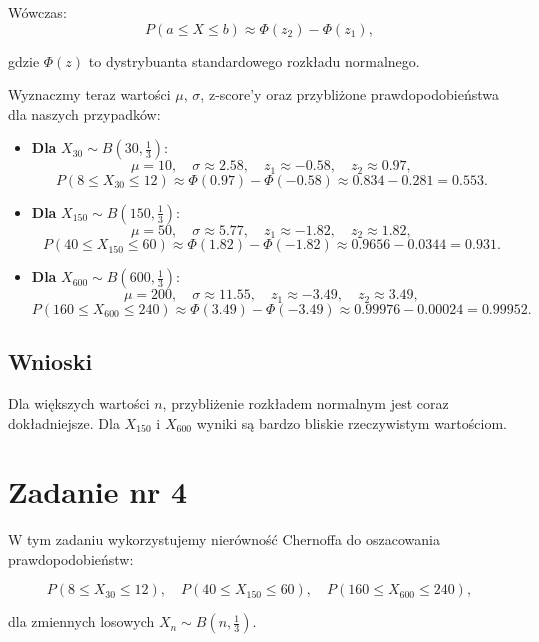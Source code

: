 \documentclass{article}
\begin{document}
Wówczas:
\[
P(a \leq X \leq b) \approx \Phi(z_2) - \Phi(z_1),
\]

gdzie \( \Phi(z) \) to dystrybuanta standardowego rozkładu normalnego.

\vspace{1em}
Wyznaczmy teraz wartości \( \mu \), \( \sigma \), z-score'y oraz przybliżone prawdopodobieństwa dla naszych przypadków:

\begin{itemize}
    \item \textbf{Dla} \( X_{30} \sim B(30, \frac{1}{3}) \):
    \[
    \mu = 10, \quad \sigma \approx 2.58, \quad
    z_1 \approx -0.58, \quad z_2 \approx 0.97,
    \]
    \[
    P(8 \leq X_{30} \leq 12) \approx \Phi(0.97) - \Phi(-0.58) \approx 0.834 - 0.281 = 0.553.
    \]

    \item \textbf{Dla} \( X_{150} \sim B(150, \frac{1}{3}) \):
    \[
    \mu = 50, \quad \sigma \approx 5.77, \quad
    z_1 \approx -1.82, \quad z_2 \approx 1.82,
    \]
    \[
    P(40 \leq X_{150} \leq 60) \approx \Phi(1.82) - \Phi(-1.82) \approx 0.9656 - 0.0344 = 0.931.
    \]

    \item \textbf{Dla} \( X_{600} \sim B(600, \frac{1}{3}) \):
    \[
    \mu = 200, \quad \sigma \approx 11.55, \quad
    z_1 \approx -3.49, \quad z_2 \approx 3.49,
    \]
    \[
    P(160 \leq X_{600} \leq 240) \approx \Phi(3.49) - \Phi(-3.49) \approx 0.99976 - 0.00024 = 0.99952.
    \]
\end{itemize}

\subsection*{Wnioski}

Dla większych wartości \( n \), przybliżenie rozkładem normalnym jest coraz dokładniejsze. Dla \( X_{150} \) i \( X_{600} \) wyniki są bardzo bliskie rzeczywistym wartościom.

\section{Zadanie nr 4}

W tym zadaniu wykorzystujemy nierówność Chernoffa do oszacowania prawdopodobieństw:

\[
P(8 \leq X_{30} \leq 12), \quad P(40 \leq X_{150} \leq 60), \quad P(160 \leq X_{600} \leq 240),
\]

dla zmiennych losowych \( X_n \sim B(n, \frac{1}{3}) \).
\end{document}
